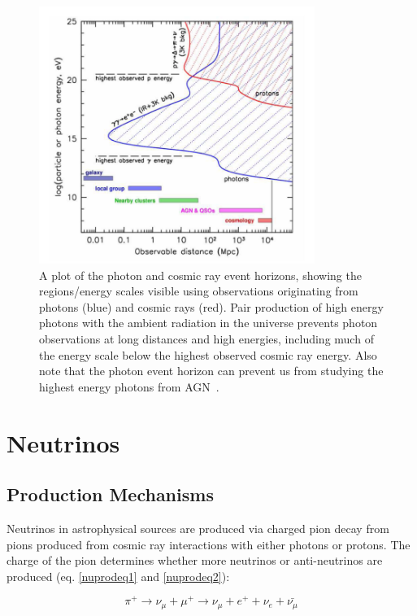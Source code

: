 \begin{figure}[h]
\centering
\includegraphics[width=0.8\textwidth]{figs/photevthorizon.png}
\caption{A plot of the photon and cosmic ray event horizons, showing the regions/energy scales visible using observations originating from photons (blue) and cosmic rays (red). Pair production of high energy photons with the ambient radiation in the universe prevents photon observations at long distances and high energies, including much of the energy scale below the highest observed cosmic ray energy. Also note that the photon event horizon can prevent us from studying the highest energy photons from AGN~\cite{Yuan_2011}. }
\label{fig:photeh}
\end{figure}

\section{Neutrinos}

\subsection{Production Mechanisms}
Neutrinos in astrophysical sources are produced via charged pion decay from pions produced from cosmic ray interactions with either photons or protons. The charge of the pion determines whether more neutrinos or anti-neutrinos are produced (eq. \ref{nuprodeq1} and \ref{nuprodeq2}):

\begin{equation}
    \pi^+ \rightarrow \nu_{\mu} + \mu^+ \rightarrow \nu_{\mu} + e^+ + \nu_{e}+\bar{\nu_{\mu}}
\label{nuprodeq1}
\end{equation}

